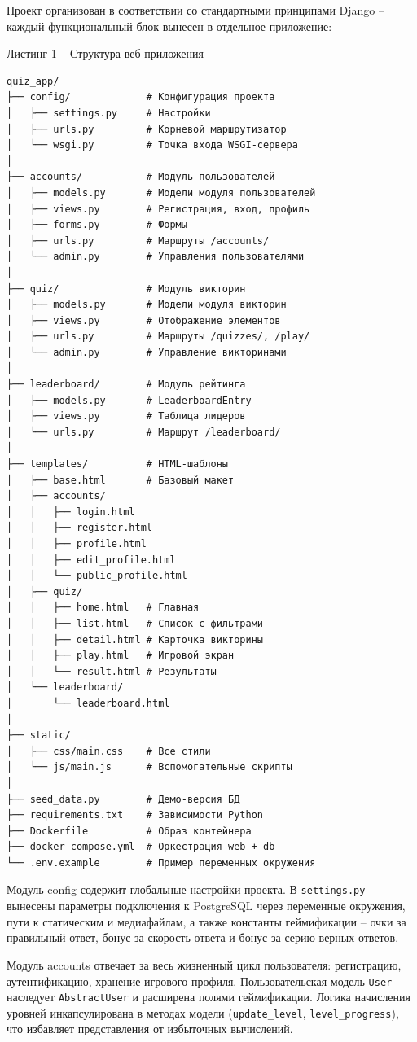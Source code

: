 \documentclass[14pt,a4paper]{extreport}
\begin{document}
Проект организован в соответствии со стандартными принципами Django -- каждый функциональный блок вынесен в отдельное приложение:
\\
\begin{center}
Листинг 1 -- Структура веб-приложения
\end{center}
\begin{verbatim}
quiz_app/
├── config/             # Конфигурация проекта
│   ├── settings.py     # Настройки
│   ├── urls.py         # Корневой маршрутизатор
│   └── wsgi.py         # Точка входа WSGI-сервера
│
├── accounts/           # Модуль пользователей
│   ├── models.py       # Модели модуля пользователей
│   ├── views.py        # Регистрация, вход, профиль
│   ├── forms.py        # Формы
│   ├── urls.py         # Маршруты /accounts/
│   └── admin.py        # Управления пользователями
│
├── quiz/               # Модуль викторин
│   ├── models.py       # Модели модуля викторин
│   ├── views.py        # Отображение элементов
│   ├── urls.py         # Маршруты /quizzes/, /play/
│   └── admin.py        # Управление викторинами
│
├── leaderboard/        # Модуль рейтинга
│   ├── models.py       # LeaderboardEntry
│   ├── views.py        # Таблица лидеров
│   └── urls.py         # Маршрут /leaderboard/
│
├── templates/          # HTML-шаблоны
│   ├── base.html       # Базовый макет
│   ├── accounts/
│   │   ├── login.html
│   │   ├── register.html
│   │   ├── profile.html
│   │   ├── edit_profile.html
│   │   └── public_profile.html
│   ├── quiz/
│   │   ├── home.html   # Главная
│   │   ├── list.html   # Список с фильтрами
│   │   ├── detail.html # Карточка викторины
│   │   ├── play.html   # Игровой экран
│   │   └── result.html # Результаты
│   └── leaderboard/
│       └── leaderboard.html
│
├── static/
│   ├── css/main.css    # Все стили
│   └── js/main.js      # Вспомогательные скрипты
│
├── seed_data.py        # Демо-версия БД
├── requirements.txt    # Зависимости Python
├── Dockerfile          # Образ контейнера
├── docker-compose.yml  # Оркестрация web + db
└── .env.example        # Пример переменных окружения
\end{verbatim}

Модуль config содержит глобальные настройки проекта. В \texttt{settings.py} вынесены параметры подключения к PostgreSQL через переменные окружения, пути к статическим и медиафайлам, а также константы геймификации -- очки за правильный ответ, бонус за скорость ответа и бонус за серию верных ответов.

Модуль accounts отвечает за весь жизненный цикл пользователя: регистрацию, аутентификацию, хранение игрового профиля. Пользовательская модель \texttt{User} наследует \texttt{AbstractUser} и расширена полями геймификации. Логика начисления уровней инкапсулирована в методах модели (\texttt{update\_level}, \texttt{level\_progress}), что избавляет представления от избыточных вычислений.
\end{document}
